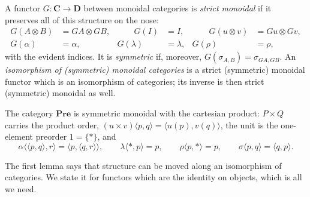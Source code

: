 \documentclass[11pt,a4paper]{article}
\theoremstyle{plain}
\theoremstyle{definition}
\theoremstyle{remark}
\newcommand{\Cat}[1]{\mathbf{#1}}
\newcommand{\Pre}{\Cat{Pre}}
\newcommand{\tup}[1]{\langle #1 \rangle}
\begin{document}
A functor $G \colon \Cat{C} \to \Cat{D}$ between monoidal categories is \emph{strict monoidal} if it preserves all of this structure on the nose:
\begin{equation}
    \label{eq:strict-monoidal-functor}
    \begin{aligned}
        G(A \otimes B) & = GA \otimes GB, & \qquad G(I) & = I, & \qquad G(u \otimes v) & = Gu \otimes Gv, \\
        G(\alpha) & = \alpha, & G(\lambda) & = \lambda, & G(\rho) & = \rho,
    \end{aligned}
\end{equation}
with the evident indices.
It is \emph{symmetric} if, moreover, $G(\sigma_{A,B}) = \sigma_{GA,GB}$.
An \emph{isomorphism of (symmetric) monoidal categories} is a strict (symmetric) monoidal functor which is an isomorphism of categories; its inverse is then strict (symmetric) monoidal as well.

The category $\Pre$ is symmetric monoidal with the cartesian product: $P \times Q$ carries the product order, $(u \times v)\tup{p,q} = \tup{u(p), v(q)}$, the unit is the one-element preorder $1 = \{*\}$, and
\begin{equation}
    \label{eq:pre-coherence}
    \alpha\tup{\tup{p,q},r} = \tup{p,\tup{q,r}},
    \qquad
    \lambda\tup{*,p} = p,
    \qquad
    \rho\tup{p,*} = p,
    \qquad
    \sigma\tup{p,q} = \tup{q,p}.
\end{equation}

The first lemma says that structure can be moved along an isomorphism of categories.
We state it for functors which are the identity on objects, which is all we need.
\end{document}
